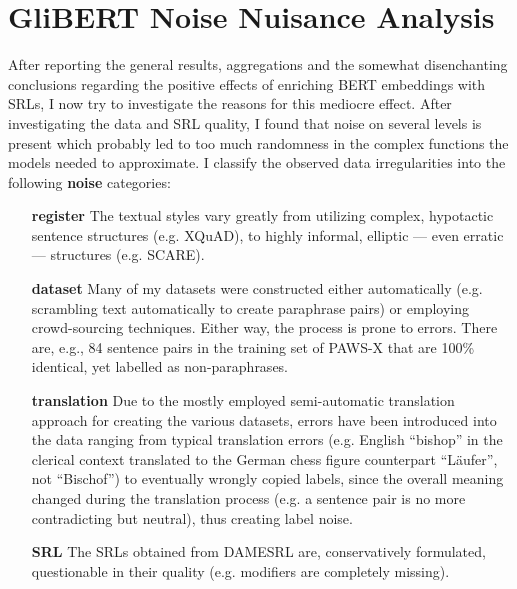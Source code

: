 \section{GliBERT Noise Nuisance Analysis}
\label{sec:glinoise}


After reporting the general results, aggregations and the somewhat disenchanting conclusions
regarding the positive effects of enriching BERT embeddings with SRLs, I now try to investigate
the reasons for this mediocre effect. After investigating the data and SRL quality, I found that
noise on several levels is present which probably led to too much randomness in the complex
functions the models needed to approximate. I classify the observed data irregularities into the
following \textbf{noise} categories:


\begin{itemize}
  \item[\textbf{register}] The textual styles vary greatly from utilizing complex,
                           hypotactic sentence structures (e.g. XQuAD), to highly
                           informal, elliptic --- even erratic --- structures
                           (e.g. SCARE).
 \item[\textbf{dataset}] Many of my datasets were constructed either automatically
                         (e.g. scrambling text automatically to create paraphrase pairs)
                         or employing crowd-sourcing techniques. Either way, the process
                         is prone to errors. There are, e.g., 84 sentence pairs in the training
                         set of PAWS-X that are 100\% identical, yet labelled as non-paraphrases.
 \item[\textbf{translation}] Due to the mostly employed semi-automatic translation
                             approach for creating the various datasets, errors
                             have been introduced into the data ranging from typical
                             translation errors (e.g. English ``bishop'' in the clerical
                             context translated to the German chess figure counterpart
                             ``Läufer'', not ``Bischof'') to eventually wrongly copied
                             labels, since the overall meaning changed during
                             the translation process (e.g. a sentence pair is no more
                             contradicting but neutral), thus creating label noise.
 \item[\textbf{SRL}] The SRLs obtained from DAMESRL are, conservatively formulated,
                     questionable in their quality (e.g. modifiers are completely missing).
\end{itemize}

